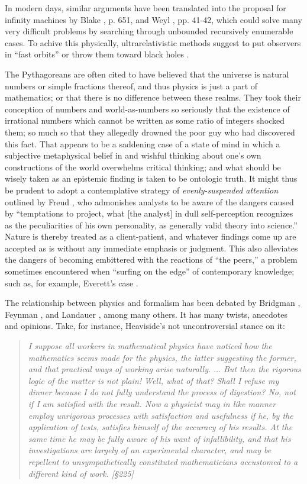 In modern days, similar arguments have been translated into the proposal for
infinity machines  by
Blake \cite{Blake26}, p. 651,
and Weyl \cite{weyl:49}, pp. 41-42,
which could solve many very difficult problems by searching through unbounded recursively enumerable cases.
To achive this physically, ultrarelativistic methods suggest to put observers in ``fast orbits'' or throw them toward
black holes \cite{pit:90}.


The Pythagoreans are often cited to have believed that the universe is natural numbers or simple fractions thereof, and thus physics is just a part of mathematics; or that
there is no difference between these realms.
They took their conception of numbers and world-as-numbers so seriously that the existence of irrational numbers which cannot
be written as some ratio of integers shocked them; so much so that they allegedly drowned the poor guy who had discovered this fact.
That appears to be a saddening case of a state of mind in which a subjective metaphysical belief in and
wishful thinking about one's own constructions of the world overwhelms critical thinking;
and what should be wisely taken as an epistemic finding is taken to be ontologic truth.
It might thus be prudent to
adopt a contemplative strategy of {\em evenly-suspended attention}
outlined by  Freud \cite{Freud-1912}, who admonishes analysts to be aware of the dangers
caused by {``temptations to project,
what  [the analyst]  in dull self-perception recognizes as the peculiarities of his own personality,
as generally valid theory into science.''}
Nature is thereby treated as a  client-patient,  and whatever findings come up are accepted  as is  without any
immediate emphasis or judgment.
This also alleviates the dangers of becoming embittered with the reactions of ``the peers,''
a problem sometimes encountered when ``surfing on the edge'' of contemporary knowledge; such as, for
example, Everett's case \cite{everett-collw}.

The relationship between physics and formalism has been debated by
Bridgman \cite{bridgman},
Feynman \cite{feynman-computation},
and  Landauer \cite{landauer},
among many others.
It has many twists, anecdotes and opinions.
Take, for instance, Heaviside's not uncontroversial stance \cite{heaviside-EMT} on it:
\begin{quote}
{\em
I suppose all workers
in mathematical physics have noticed how the mathematics
seems made for the physics, the latter suggesting the former, and
that practical ways of working arise naturally. $\ldots$ But then the
rigorous logic of the matter is not plain! Well, what of that?
Shall I refuse my dinner because I do not fully understand the
process of digestion? No, not if I am satisfied with the result.
Now a physicist may in like manner employ unrigorous processes with satisfaction and usefulness if he, by the application
of tests, satisfies himself of the accuracy of his results. At
the same time he may be fully aware of his want of infallibility,
and that his investigations are largely of an experimental character, and may be repellent to unsympathetically
constituted mathematicians accustomed to a different kind
of work.  [\S 225]
}
\label{2013-m-ch-intro-cooking}
\end{quote}

